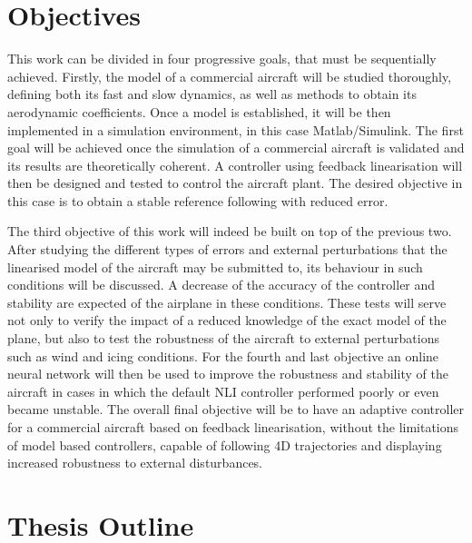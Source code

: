 \section{Objectives}
\label{section:objectives}

This work can be divided in four progressive goals, that must be sequentially achieved. Firstly, the model of a commercial aircraft will be studied thoroughly, defining both its fast and slow dynamics, as well as methods to obtain its aerodynamic coefficients. Once a model is established, it will be then implemented in a simulation environment, in this case Matlab/Simulink. The first goal will be achieved once the simulation of a commercial aircraft is validated and its results are theoretically coherent. A controller using feedback linearisation will then be designed and tested to control the aircraft plant. The desired objective in this case is to obtain a stable reference following with reduced error.

The third objective of this work will indeed be built on top of the previous two. After studying the different types of errors and external perturbations that the linearised model of the aircraft may be submitted to, its behaviour in such conditions will be discussed. A decrease of the accuracy of the controller and stability are expected of the airplane in these conditions.
These tests will serve not only to verify the impact of a reduced knowledge of the exact model of the plane, but also to test the robustness of the aircraft to external perturbations such as wind and icing conditions. For the fourth and last objective an online neural network will then be used to improve the robustness and stability of the aircraft in cases in which the default NLI controller performed poorly or even became unstable. The overall final objective will be to have an adaptive controller for a commercial aircraft based on feedback linearisation, without the limitations of model based controllers, capable of following 4D trajectories and displaying increased robustness to external disturbances. 






\section{Thesis Outline}
\label{section:outline}

